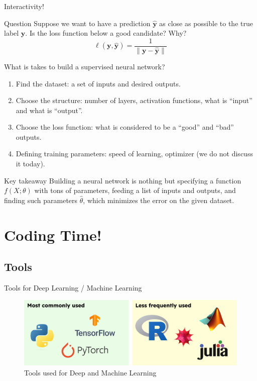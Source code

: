 \documentclass{beamer}
\begin{document}
    \begin{frame}{Interactivity!}
        \begin{block}{Question}
            Suppose we want to have a prediction $\hat{\boldsymbol{y}}$ as close as possible to the true label $\boldsymbol{y}$. Is the loss function below a good candidate? Why?
            \[
            \ell(\mathbf{y},\hat{\mathbf{y}}) = \frac{1}{\|\mathbf{y}-\hat{\mathbf{y}}\|}
            \]
        \end{block}
    \end{frame}

    \begin{frame}{What is takes to build a supervised neural network?}
        \begin{enumerate}
            \item Find the dataset: a set of inputs and desired outputs.
            \item Choose the structure: number of layers, activation functions, what is ``input'' and what is ``output''.
            \item Choose the loss function: what is considered to be a ``good'' and ``bad'' outputs.
            \item Defining training parameters: speed of learning, optimizer (we do not discuss it today).
        \end{enumerate}\pause

        \begin{block}{Key takeaway}
            Building a neural network is nothing but specifying a function $f(X;\theta)$ with tons of parameters, feeding a list of inputs and outputs, and finding such parameters $\hat{\theta}$, which minimizes the error on the given dataset.
        \end{block}
    \end{frame}

    \section{Coding Time!}

    \subsection{Tools}

    \begin{frame}{Tools for Deep Learning / Machine Learning}
        \begin{figure}
        \centering
            \includegraphics[width=\textwidth]{images/presentation/tools.png}
            \caption{Tools used for Deep and Machine Learning}
        \end{figure}
    \end{frame}
\end{document}
